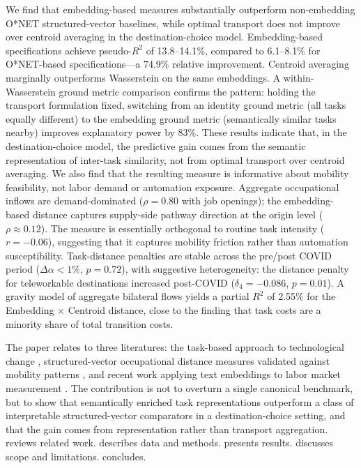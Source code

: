 \documentclass[12pt]{article}
\begin{document}
We find that embedding-based measures substantially outperform non-embedding O*NET structured-vector baselines, while optimal transport does not improve over centroid averaging in the destination-choice model. Embedding-based specifications achieve pseudo-$R^2$ of 13.8--14.1\%, compared to 6.1--8.1\% for O*NET-based specifications---a 74.9\% relative improvement. Centroid averaging marginally outperforms Wasserstein on the same embeddings. A within-Wasserstein ground metric comparison confirms the pattern: holding the transport formulation fixed, switching from an identity ground metric (all tasks equally different) to the embedding ground metric (semantically similar tasks nearby) improves explanatory power by 83\%. These results indicate that, in the destination-choice model, the predictive gain comes from the semantic representation of inter-task similarity, not from optimal transport over centroid averaging. We also find that the resulting measure is informative about mobility feasibility, not labor demand or automation exposure. Aggregate occupational inflows are demand-dominated ($\rho = 0.80$ with job openings); the embedding-based distance captures supply-side pathway direction at the origin level ($\rho \approx 0.12$). The measure is essentially orthogonal to routine task intensity ($r = -0.06$), suggesting that it captures mobility friction rather than automation susceptibility. Task-distance penalties are stable across the pre/post COVID period ($\Delta\alpha < 1\%$, $p = 0.72$), with suggestive heterogeneity: the distance penalty for teleworkable destinations increased post-COVID ($\delta_4 = -0.086$, $p = 0.01$). A gravity model of aggregate bilateral flows yields a partial $R^2$ of 2.55\% for the Embedding $\times$ Centroid distance, close to the \citet{CortesGallipoli2018} finding that task costs are a minority share of total transition costs.

The paper relates to three literatures: the task-based approach to technological change \citep{AutorLevyMurnane2003,AcemogluAutor2011}, structured-vector occupational distance measures validated against mobility patterns \citep{GathmannSchonberg2010,CortesGallipoli2018,MouwEtAl2024,SchuStanTaska2024}, and recent work applying text embeddings to labor market measurement \citep{ZhangEtAl2021,DecorteEtAl2022,HampoleEtAl2025}. The contribution is not to overturn a single canonical benchmark, but to show that semantically enriched task representations outperform a class of interpretable structured-vector comparators in a destination-choice setting, and that the gain comes from representation rather than transport aggregation.  reviews related work.  describes data and methods.  presents results.  discusses scope and limitations.  concludes.
\end{document}
